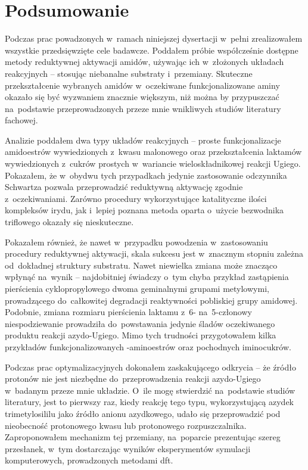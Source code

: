 \chapter{Podsumowanie}\label{chapter:conclusions}
Podczas prac powadzonych w~ramach niniejszej dysertacji w~pełni zrealizowałem wszystkie
  przedsięwzięte cele badawcze.
Poddałem próbie współcześnie dostępne metody reduktywnej aktywacji amidów,
  używając ich w~złożonych układach reakcyjnych \--- stosując niebanalne substraty i~przemiany.
Skuteczne przekształcenie wybranych amidów w~oczekiwane funkcjonalizowane aminy okazało się
  być wyzwaniem znacznie większym, niż można by przypuszczać na~podstawie przeprowadzonych
  przeze mnie wnikliwych studiów literatury fachowej.

Analizie poddałem dwa typy układów reakcyjnych \--- proste funkcjonalizacje amidoestrów
  wywiedzionych z~kwasu malonowego oraz przekształcenia laktamów wywiedzionych
  z~cukrów prostych w~wariancie wieloskładnikowej reakcji Ugiego.
Pokazałem, że w~obydwu tych przypadkach jedynie zastosowanie odczynnika Schwartza pozwala
  przeprowadzić reduktywną aktywację zgodnie z~oczekiwaniami.
Zarówno procedury wykorzystujące katalityczne ilości kompleksów irydu, jak i~lepiej poznana
  metoda oparta o~użycie bezwodnika triflowego okazały się nieskuteczne.

Pokazałem również, że nawet w~przypadku powodzenia w~zastosowaniu procedury reduktywnej aktywacji,
  skala sukcesu jest w~znacznym stopniu zależna od~dokładnej struktury substratu.
Nawet niewielka zmiana może znacząco wpłynąć na~wynik \--- najdobitniej świadczy o~tym chyba
  przykład zastąpienia pierścienia cyklopropylowego dwoma geminalnymi grupami metylowymi,
  prowadzącego do~całkowitej degradacji reaktywności pobliskiej grupy amidowej.
Podobnie, zmiana rozmiaru pierścienia laktamu z~6- na~5-członowy niespodziewanie prowadziła
  do~powstawania jedynie śladów oczekiwanego produktu reakcji azydo-Ugiego.
Mimo tych trudności przygotowałem kilka przykładów funkcjonalizowanych \textbeta-aminoestrów
  oraz pochodnych iminocukrów.

Podczas prac optymalizacyjnych dokonałem zaskakującego odkrycia \--- że źródło protonów nie jest
  niezbędne do~przeprowadzenia reakcji azydo-Ugiego w~badanym przeze mnie układzie.
O~ile mogę stwierdzić na~podstawie studiów literatury, jest to pierwszy raz, kiedy reakcję tego
  typu, wykorzystującą azydek trimetylosililu jako źródło anionu azydkowego,
  udało się przeprowadzić pod nieobecność protonowego kwasu lub protonowego rozpuszczalnika.
Zaproponowałem mechanizm tej przemiany, na~poparcie prezentując szereg przesłanek,
  w~tym dostarczając wyników eksperymentów symulacji komputerowych, prowadzonych metodami \gls{dft}.
